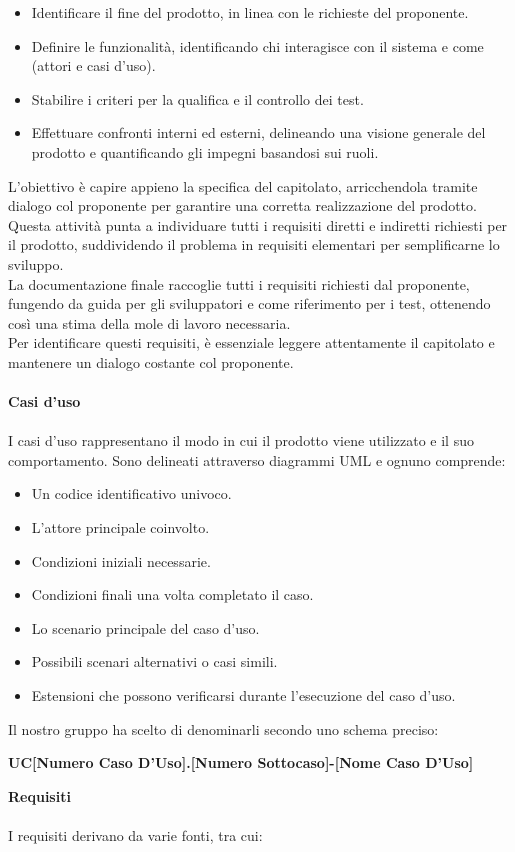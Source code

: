 \documentclass{article}
\begin{document}
\begin{itemize}
    \item Identificare il fine del prodotto, in linea con le richieste del proponente.
    \item Definire le funzionalità, identificando chi interagisce con il sistema e come (attori e casi d'uso).
    \item Stabilire i criteri per la qualifica e il controllo dei test.
    \item Effettuare confronti interni ed esterni, delineando una visione generale del prodotto e quantificando gli impegni basandosi sui ruoli.
\end{itemize}
L'obiettivo è capire appieno la specifica del capitolato, arricchendola tramite dialogo col proponente per garantire una corretta realizzazione del prodotto.\\
Questa attività punta a individuare tutti i requisiti diretti e indiretti richiesti per il prodotto, suddividendo il problema in requisiti elementari per semplificarne lo sviluppo.\\
La documentazione finale raccoglie tutti i requisiti richiesti dal proponente, fungendo da guida per gli sviluppatori e come riferimento per i test, ottenendo così una stima della mole di lavoro necessaria.\\
Per identificare questi requisiti, è essenziale leggere attentamente il capitolato e mantenere un dialogo costante col proponente.\\\\
\textbf{Casi d'uso}\\\\
I casi d'uso rappresentano il modo in cui il prodotto viene utilizzato e il suo comportamento. Sono delineati attraverso diagrammi UML e ognuno comprende:

\begin{itemize}
    \item Un codice identificativo univoco.
    \item L'attore principale coinvolto.
    \item Condizioni iniziali necessarie.
    \item Condizioni finali una volta completato il caso.
    \item Lo scenario principale del caso d'uso.
    \item Possibili scenari alternativi o casi simili.
    \item Estensioni che possono verificarsi durante l'esecuzione del caso d'uso.
\end{itemize}
Il nostro gruppo ha scelto di denominarli secondo uno schema preciso: 
\begin{center}
    \textbf{UC[Numero Caso D'Uso].[Numero Sottocaso]-[Nome Caso D'Uso]}
\end{center}
\textbf{Requisiti}\\\\
I requisiti derivano da varie fonti, tra cui:
\end{document}
